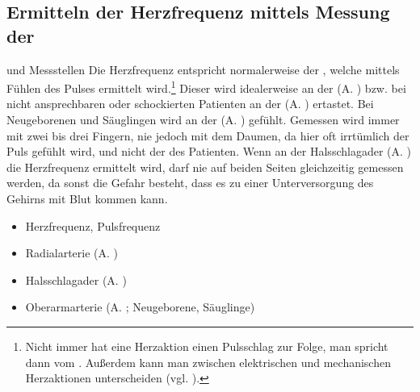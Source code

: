 


\subsection{Ermitteln der Herzfrequenz mittels Messung der
}
\label{topic:pulsmessung}


\TextSlide
{{\TxBeschreibung} und Messstellen}
{%
%
Die Herzfrequenz entspricht normalerweise der
, welche mittels Fühlen des Pulses 
ermittelt wird.\footnote{Nicht
immer hat eine Herzaktion einen Pulsschlag zur Folge, man
spricht dann vom . Außerdem kann man
zwischen elektrischen und mechanischen Herzaktionen
unterscheiden (vgl. ).}
Dieser wird idealerweise an der
 (A. ) bzw. bei nicht
ansprechbaren oder schockierten Patienten an der
 (A. ) ertastet. Bei
Neugeborenen und Säuglingen wird an der
 (A. ) gefühlt. Gemessen
wird immer mit zwei bis drei Fingern, nie jedoch mit dem
Daumen, da hier oft irrtümlich der  Puls gefühlt
wird, und nicht der des Patienten. Wenn an der
Halsschlagader (A. ) die Herzfrequenz ermittelt
wird, darf nie auf beiden Seiten gleichzeitig gemessen
werden, da sonst die Gefahr besteht,
dass es zu einer Unterversorgung des Gehirns mit Blut kommen
kann.
}
{%
\begin{itemize}
  \item Herzfrequenz, Pulsfrequenz
  \item {Radialarterie} (A. )
  \item {Halsschlagader} (A. )
  \item {Oberarmarterie} (A. ; Neugeborene, Säuglinge)
\end{itemize}
}
{}
{}
{}

